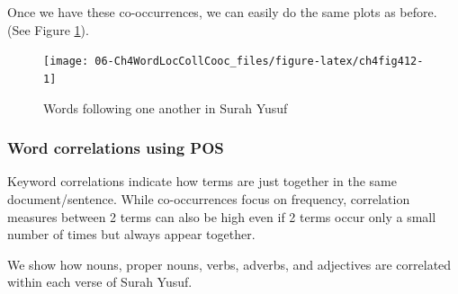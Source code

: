 \documentclass[
]{article}
\newenvironment{Shaded}{\begin{snugshade}}{\end{snugshade}}
\newcommand{\AttributeTok}[1]{\textcolor[rgb]{0.13,0.29,0.53}{#1}}
\newcommand{\ConstantTok}[1]{\textcolor[rgb]{0.56,0.35,0.01}{#1}}
\newcommand{\DecValTok}[1]{\textcolor[rgb]{0.00,0.00,0.81}{#1}}
\newcommand{\FloatTok}[1]{\textcolor[rgb]{0.00,0.00,0.81}{#1}}
\newcommand{\FunctionTok}[1]{\textcolor[rgb]{0.13,0.29,0.53}{\textbf{#1}}}
\newcommand{\NormalTok}[1]{#1}
\newcommand{\OtherTok}[1]{\textcolor[rgb]{0.56,0.35,0.01}{#1}}
\newcommand{\SpecialCharTok}[1]{\textcolor[rgb]{0.81,0.36,0.00}{\textbf{#1}}}
\newcommand{\StringTok}[1]{\textcolor[rgb]{0.31,0.60,0.02}{#1}}
\begin{document}
Once we have these co-occurrences, we can easily do the same plots as before. (See Figure \ref{fig:ch4fig412}).

\begin{figure}

{\centering \texttt{[image: 06-Ch4WordLocCollCooc\_files/figure-latex/ch4fig412-1]} 

}

\caption{Words following one another in Surah Yusuf}\label{fig:ch4fig412}
\end{figure}

\hypertarget{word-correlations-using-pos}{%
\subsubsection{Word correlations using POS}\label{word-correlations-using-pos}}

Keyword correlations indicate how terms are just together in the same document/sentence. While co-occurrences focus on frequency, correlation measures between 2 terms can also be high even if 2 terms occur only a small number of times but always appear together.

We show how nouns, proper nouns, verbs, adverbs, and adjectives are correlated within each verse of Surah Yusuf.

\footnotesize

\begin{Shaded}
\end{Shaded}
\end{document}
